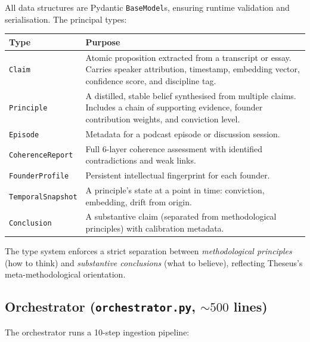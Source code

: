 \documentclass[11pt,letterpaper]{article}
\begin{document}
All data structures are Pydantic \texttt{BaseModel}s, ensuring runtime validation and serialisation. The principal types:

\begin{tabularx}{\textwidth}{lX}
\toprule
\textbf{Type} & \textbf{Purpose} \\
\midrule
\texttt{Claim} & Atomic proposition extracted from a transcript or essay. Carries speaker attribution, timestamp, embedding vector, confidence score, and discipline tag. \\
\texttt{Principle} & A distilled, stable belief synthesised from multiple claims. Includes a chain of supporting evidence, founder contribution weights, and conviction level. \\
\texttt{Episode} & Metadata for a podcast episode or discussion session. \\
\texttt{CoherenceReport} & Full 6-layer coherence assessment with identified contradictions and weak links. \\
\texttt{FounderProfile} & Persistent intellectual fingerprint for each founder. \\
\texttt{TemporalSnapshot} & A principle's state at a point in time: conviction, embedding, drift from origin. \\
\texttt{Conclusion} & A substantive claim (separated from methodological principles) with calibration metadata. \\
\bottomrule
\end{tabularx}

The type system enforces a strict separation between \emph{methodological principles} (how to think) and \emph{substantive conclusions} (what to believe), reflecting Theseus's meta-methodological orientation.

\subsection{Orchestrator (\texttt{orchestrator.py}, ${\sim}500$ lines)}

The orchestrator runs a 10-step ingestion pipeline:
\end{document}

